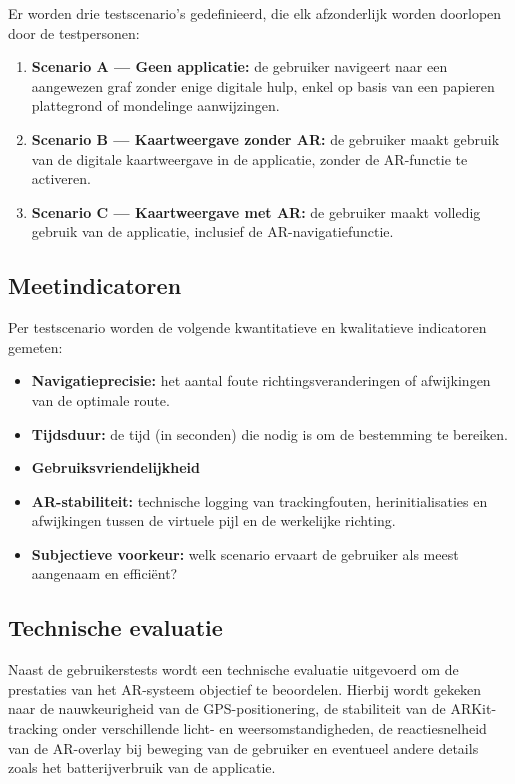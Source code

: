 Er worden drie testscenario's gedefinieerd, die elk afzonderlijk worden doorlopen door de testpersonen:

\begin{enumerate}
    \item \textbf{Scenario A — Geen applicatie:} de gebruiker navigeert naar een aangewezen graf zonder enige digitale hulp, enkel op basis van een papieren plattegrond of mondelinge aanwijzingen.
    \item \textbf{Scenario B — Kaartweergave zonder AR:} de gebruiker maakt gebruik van de digitale kaartweergave in de applicatie, zonder de AR-functie te activeren.
    \item \textbf{Scenario C — Kaartweergave met AR:} de gebruiker maakt volledig gebruik van de applicatie, inclusief de AR-navigatiefunctie.
\end{enumerate}

\subsection{Meetindicatoren}

Per testscenario worden de volgende kwantitatieve en kwalitatieve indicatoren gemeten:

\begin{itemize}
    \item \textbf{Navigatieprecisie:} het aantal foute richtingsveranderingen of afwijkingen van de optimale route.
    \item \textbf{Tijdsduur:} de tijd (in seconden) die nodig is om de bestemming te bereiken.
    \item \textbf{Gebruiksvriendelijkheid}
    \item \textbf{AR-stabiliteit:} technische logging van trackingfouten, herinitialisaties en afwijkingen tussen de virtuele pijl en de werkelijke richting.
    \item \textbf{Subjectieve voorkeur:} welk scenario ervaart de gebruiker als meest aangenaam en efficiënt?
\end{itemize}

\subsection{Technische evaluatie}

Naast de gebruikerstests wordt een technische evaluatie uitgevoerd om de prestaties van het AR-systeem objectief te beoordelen. Hierbij wordt gekeken naar de nauwkeurigheid van de GPS-positionering, de stabiliteit van de ARKit-tracking onder verschillende licht- en weersomstandigheden, de reactiesnelheid van de AR-overlay bij beweging van de gebruiker en eventueel andere details zoals het batterijverbruik van de applicatie.


